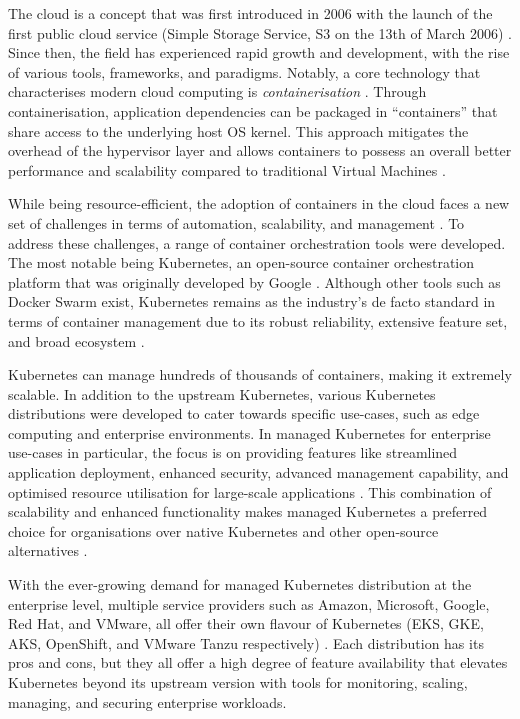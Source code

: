 The cloud is a concept that was first introduced in 2006 with the launch of the first public cloud service (Simple Storage Service, S3 on the 13th of March 2006) \cite{kratzke_understanding_2017}. Since then, the field has experienced rapid growth and development, with the rise of various tools, frameworks, and paradigms. Notably, a core technology that characterises modern cloud computing is \textit{containerisation} \cite{pereira_ferreira_performance_2019}. Through containerisation, application dependencies can be packaged in “containers” that share access to the underlying host OS kernel. This approach mitigates the overhead of the hypervisor layer and allows containers to possess an overall better performance and scalability compared to traditional Virtual Machines \cite{felter_updated_2015, spoiala_performance_2016, joy_performance_2015}.

While being resource-efficient, the adoption of containers in the cloud faces a new set of challenges in terms of automation, scalability, and management \cite{pereira_ferreira_performance_2019}. To address these challenges, a range of container orchestration tools were developed. The most notable being Kubernetes, an open-source container orchestration platform that was originally developed by Google \cite{noauthor_kubernetes_nodate, pereira_ferreira_performance_2019}. Although other tools such as Docker Swarm exist, Kubernetes remains as the industry’s de facto standard in terms of container management due to its robust reliability, extensive feature set, and broad ecosystem \cite{truyen_comprehensive_2019}.

Kubernetes can manage hundreds of thousands of containers, making it extremely scalable. In addition to the upstream Kubernetes, various Kubernetes distributions were developed to cater towards specific use-cases, such as edge computing and enterprise environments. In managed Kubernetes for enterprise use-cases in particular, the focus is on providing features like streamlined application deployment, enhanced security, advanced management capability, and optimised resource utilisation for large-scale applications \cite{noauthor_what_nodate, truyen_comprehensive_2019, schaffererin_what_2024}. This combination of scalability and enhanced functionality makes managed Kubernetes a preferred choice for organisations over native Kubernetes and other open-source alternatives \cite{red_hat_inc_state_2024, canonical_kubernetes_2022, portworx_kubernetes_2021, broadcom_state_2023}.

With the ever-growing demand for managed Kubernetes distribution at the enterprise level, multiple service providers such as Amazon, Microsoft, Google, Red Hat, and VMware, all offer their own flavour of Kubernetes (EKS, GKE, AKS, OpenShift, and VMware Tanzu respectively) \cite{noauthor_amazon_nodate, noauthor_gke_nodate, nickomang_azure_nodate, red_hat_inc_red_nodate, noauthor_vmware_nodate}. Each distribution has its pros and cons, but they all offer a high degree of feature availability that elevates Kubernetes beyond its upstream version with tools for monitoring, scaling, managing, and securing enterprise workloads.

